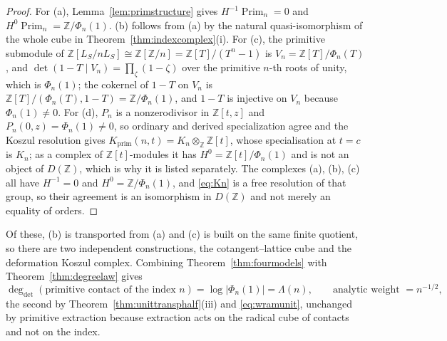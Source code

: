 \documentclass[11pt]{amsart}
\theoremstyle{definition}
\theoremstyle{remark}
\newcommand{\Z}{\mathbb Z}
\newcommand{\Prim}{\operatorname{Prim}}
\newcommand{\degdet}{\operatorname{deg}_{\mathrm{det}}}
\begin{document}
\begin{proof}
For (a), Lemma~\ref{lem:primstructure} gives $H^{-1}\Prim_n=0$ and
$H^0\Prim_n=\Z/\Phi_n(1)$. (b) follows from (a) by the natural
quasi-isomorphism of the whole cube in Theorem~\ref{thm:indexcomplex}(i). For
(c), the primitive submodule of $\Z[L_S/nL_S]\cong\Z[\Z/n]=\Z[T]/(T^n-1)$ is
$V_n=\Z[T]/\Phi_n(T)$, and $\det(1-T\mid V_n)=\prod_{\zeta}(1-\zeta)$ over the
primitive $n$-th roots of unity, which is $\Phi_n(1)$; the cokernel of $1-T$ on
$V_n$ is $\Z[T]/(\Phi_n(T),1-T)=\Z/\Phi_n(1)$, and $1-T$ is injective on $V_n$
because $\Phi_n(1)\ne0$. For (d), $P_n$ is a nonzerodivisor in $\Z[t,z]$ and
$P_n(0,z)=\Phi_n(1)\ne0$, so ordinary and derived specialization agree and the
Koszul resolution gives $K_{\mathrm{prim}}(n,t)=K_n\otimes_\Z\Z[t]$, whose
specialisation at $t=c$ is $K_n$; as a complex of $\Z[t]$-modules it has
$H^0=\Z[t]/\Phi_n(1)$ and is not an object of $D(\Z)$, which is why it is
listed separately. The complexes (a), (b), (c) all have $H^{-1}=0$ and
$H^0=\Z/\Phi_n(1)$, and \eqref{eq:Kn} is a free resolution of that group, so
their agreement is an isomorphism in $D(\Z)$ and not merely an equality of
orders.
\end{proof}

Of these, (b) is transported from (a) and (c) is built on the same finite
quotient, so there are two independent constructions, the cotangent--lattice
cube and the deformation Koszul complex. Combining
Theorem~\ref{thm:fourmodels} with Theorem~\ref{thm:degreelaw} gives
\begin{equation}\label{eq:degcontact}
  \degdet(\text{primitive contact of the index } n)=\log|\Phi_n(1)|=\Lambda(n),
  \qquad \text{analytic weight }=n^{-1/2},
\end{equation}
the second by Theorem~\ref{thm:unittransphalf}(iii) and \eqref{eq:wramunit},
unchanged by primitive extraction because extraction acts on the radical cube
of contacts and not on the index.
\end{document}
